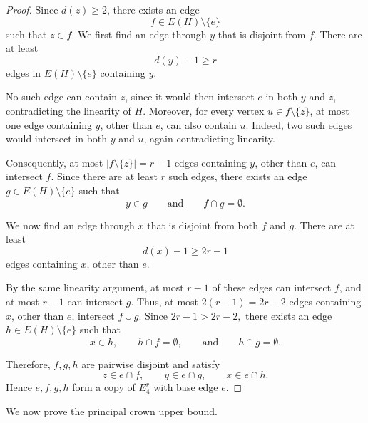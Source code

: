\documentclass[11pt,a4paper]{article}
\theoremstyle{definition}
\theoremstyle{remark}
\begin{document}
\begin{proof}
Since \(d(z)\geq2\), there exists an edge
$$
f\in E(H)\setminus\{e\}
$$
such that \(z\in f\). We first find an edge through \(y\) that is disjoint from \(f\). There
are at least
$$
d(y)-1\geq r
$$
edges in \(E(H)\setminus\{e\}\) containing \(y\).

No such edge can contain \(z\), since it would then intersect \(e\) in
both \(y\) and \(z\), contradicting the linearity of \(H\). Moreover,
for every vertex \(u\in f\setminus\{z\}\), at most one edge containing
\(y\), other than \(e\), can also contain \(u\). Indeed, two such edges
would intersect in both \(y\) and \(u\), again contradicting
linearity.

Consequently, at most
$|f\setminus\{z\}|=r-1
$ edges containing \(y\), other than \(e\), can intersect \(f\). Since
there are at least \(r\) such edges, there exists an edge
$
g\in E(H)\setminus\{e\}
$
such that
$$
y\in g
\qquad\text{and}\qquad
f\cap g=\emptyset.
$$

We now find an edge through \(x\) that is disjoint from both \(f\) and
\(g\). There are at least
$$
d(x)-1\geq2r-1
$$
edges containing \(x\), other than \(e\).

By the same linearity argument, at most \(r-1\) of these edges can
intersect \(f\), and at most \(r-1\) can intersect \(g\). Thus, at most
$
2(r-1)=2r-2
$ edges containing \(x\), other than \(e\), intersect \(f\cup g\).
Since $
2r-1>2r-2,$
there exists an edge
$
h\in E(H)\setminus\{e\}
$
such that
$$
x\in h,\qquad
h\cap f=\emptyset,
\qquad\text{and}\qquad
h\cap g=\emptyset.
$$

Therefore, \(f,g,h\) are pairwise disjoint and satisfy
$$
z\in e\cap f,\qquad
y\in e\cap g,\qquad
x\in e\cap h.
$$
Hence \(e,f,g,h\) form a copy of \(E_4^r\) with base edge \(e\).
\end{proof}

We now prove the principal crown upper bound.
\end{document}
